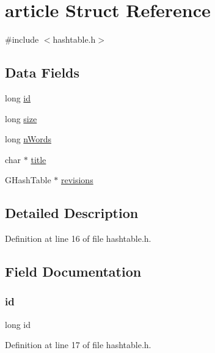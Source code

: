 \hypertarget{structarticle}{}\section{article Struct Reference}
\label{structarticle}


{\ttfamily \#include $<$hashtable.\+h$>$}

\subsection*{Data Fields}
\begin{DoxyCompactItemize}
\item 
long \hyperlink{structarticle_a7350fbd6ad10618f3b750b1f99ca5c3c}{id}
\item 
long \hyperlink{structarticle_a37363161b41c4165b98cba7abc7a9d95}{size}
\item 
long \hyperlink{structarticle_a8f3b120f62a680a9f929153f15c28baf}{n\+Words}
\item 
char $\ast$ \hyperlink{structarticle_af06d911bb9e05f491ef3da520d03796c}{title}
\item 
G\+Hash\+Table $\ast$ \hyperlink{structarticle_a5b12469c773e88300c38ce18f013d4a6}{revisions}
\end{DoxyCompactItemize}


\subsection{Detailed Description}


Definition at line 16 of file hashtable.\+h.



\subsection{Field Documentation}
\mbox{\label{structarticle_a7350fbd6ad10618f3b750b1f99ca5c3c}} 
\subsubsection{\texorpdfstring{id}{id}}
{\footnotesize\ttfamily long id}



Definition at line 17 of file hashtable.\+h.

\mbox{\label{structarticle_a8f3b120f62a680a9f929153f15c28baf}} 
